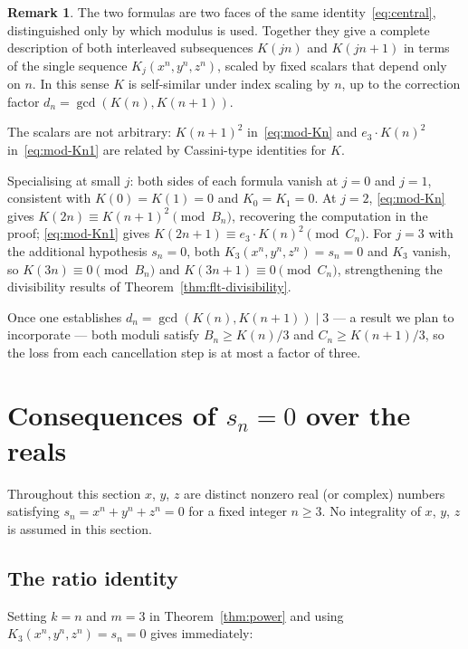 \documentclass[12pt]{article}
\theoremstyle{definition}
\newtheorem{remark}[theorem]{Remark}
\begin{document}
	\begin{remark}
		The two formulas are two faces of the same identity~\eqref{eq:central},
		distinguished only by which modulus is used.  Together they give a
		complete description of both interleaved subsequences $K(jn)$ and
		$K(jn+1)$ in terms of the single sequence $K_j(x^n,y^n,z^n)$, scaled
		by fixed scalars that depend only on $n$.  In this sense $K$ is
		self-similar under index scaling by $n$, up to the correction factor
		$d_n = \gcd(K(n), K(n+1))$.
		
		The scalars are not arbitrary: $K(n+1)^2$ in~\eqref{eq:mod-Kn} and
		$e_3 \cdot K(n)^2$ in~\eqref{eq:mod-Kn1} are related by
		Cassini-type identities for $K$.
		
		Specialising at small $j$: both sides of each formula vanish at $j=0$
		and $j=1$, consistent with $K(0)=K(1)=0$ and $K_0=K_1=0$.  At $j=2$,
		\eqref{eq:mod-Kn} gives $K(2n) \equiv K(n+1)^2 \pmod{B_n}$,
		recovering the computation in the proof; \eqref{eq:mod-Kn1} gives
		$K(2n+1) \equiv e_3 \cdot K(n)^2 \pmod{C_n}$.
		For $j=3$ with the additional hypothesis $s_n = 0$, both
		$K_3(x^n,y^n,z^n) = s_n = 0$ and $K_{3}$ vanish, so
		$K(3n) \equiv 0 \pmod{B_n}$ and $K(3n+1) \equiv 0 \pmod{C_n}$,
		strengthening the divisibility results of
		Theorem~\ref{thm:flt-divisibility}.
		
		Once one establishes $d_n = \gcd(K(n), K(n+1)) \mid 3$ — a result
		we plan to incorporate — both moduli satisfy $B_n \geq K(n)/3$ and
		$C_n \geq K(n+1)/3$, so the loss from each cancellation step is at
		most a factor of three.
	\end{remark}
	
	\section{Consequences of $s_n = 0$ over the reals}
	\label{sec:sn-zero}
	
	Throughout this section $x$, $y$, $z$ are distinct nonzero real (or
	complex) numbers satisfying $s_n = x^n + y^n + z^n = 0$ for a fixed
	integer $n \geq 3$.  No integrality of $x$, $y$, $z$ is assumed in this section.
	
	\subsection{The ratio identity}
	
	Setting $k = n$ and $m = 3$ in Theorem~\ref{thm:power} and using
	$K_3(x^n, y^n, z^n) = s_n = 0$ gives immediately:
	
\end{document}
